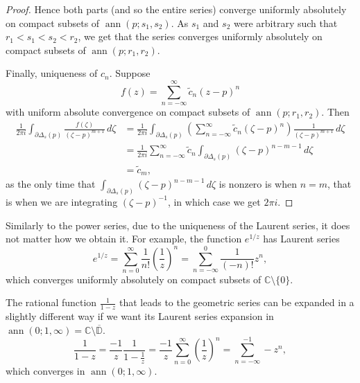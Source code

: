 \documentclass[12pt,openany]{book}
\newcommand{\ann}{\operatorname{ann}}
\newcommand{\C}{{\mathbb{C}}}
\newcommand{\D}{{\mathbb{D}}}
\theoremstyle{plain}
\theoremstyle{remark}
\theoremstyle{definition}
\theoremstyle{exercise}
\theoremstyle{example}
\begin{document}
\begin{proof}
Hence both parts (and so the entire series) 
converge uniformly absolutely on compact
subsets of $\ann(p;s_1,s_2)$.  As $s_1$ and $s_2$ were arbitrary such that
$r_1 < s_1 < s_2 < r_2$, we get that the series
converges uniformly absolutely on compact subsets of $\ann(p;r_1,r_2)$.

Finally, uniqueness of $c_n$.  Suppose
\begin{equation*}
f(z)
=
\sum_{n=-\infty}^{\infty} \tilde{c}_n {(z-p)}^{n} 
\end{equation*}
with uniform absolute convergence on compact subsets of $\ann(p;r_1,r_2)$.
Then
\begin{equation*}
\begin{split}
\frac{1}{2\pi i}
\int_{\partial \Delta_{s}(p)} \frac{f(\zeta)}{{(\zeta-p)}^{m+1}}
 \, d\zeta 
& =
\frac{1}{2\pi i}
\int_{\partial \Delta_{s}(p)}
\left(\sum_{n=-\infty}^{\infty} \tilde{c}_n {(\zeta-p)}^{n} \right)
\frac{1}{{(\zeta-p)}^{m+1}}
 \, d\zeta 
\\
& =
\frac{1}{2\pi i}
\sum_{n=-\infty}^{\infty}
\tilde{c}_n
\int_{\partial \Delta_{s}(p)}
{(\zeta-p)}^{n-m-1}
 \, d\zeta 
\\
& =
\tilde{c}_m ,
\end{split}
\end{equation*}
as the only time that 
$\int_{\partial \Delta_{s}(p)}
{(\zeta-p)}^{n-m-1}
 \, d\zeta$ is nonzero is when $n=m$, that is when we are integrating
${(\zeta-p)}^{-1}$, in which case we get $2 \pi i$.
\end{proof}

Similarly to the power series, due to the uniqueness of the Laurent series,
it does not matter how we obtain it.  For example, the function $e^{1/z}$
has Laurent series
\begin{equation*}
e^{1/z}
=
\sum_{n=0}^{\infty} \frac{1}{n!} {\left(\frac{1}{z}\right)}^n
=
\sum_{n=-\infty}^0 \frac{1}{(-n)!} z^n ,
\end{equation*}
which converges uniformly absolutely on compact subsets of
$\C \setminus \{ 0 \}$.

The rational function $\frac{1}{1-z}$ that leads to the geometric series can
be expanded in a slightly different way if we want its Laurent series
expansion in $\ann(0;1,\infty) = \C \setminus \overline{\D}$.
\begin{equation*}
\frac{1}{1-z}
=
\frac{-1}{z}
\frac{1}{1-\frac{1}{z}}
=
\frac{-1}{z}
\sum_{n=0}^\infty
{\left(\frac{1}{z}\right)}^n
=
\sum_{n=-\infty}^{-1}
- z^{n} ,
\end{equation*}
which converges in $\ann(0;1,\infty)$.
\end{document}
